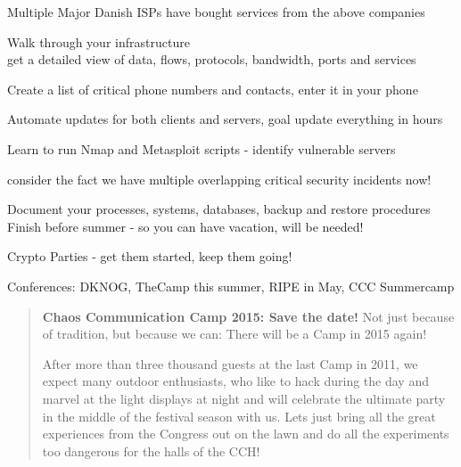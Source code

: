 \documentclass[20pt,landscape,a4paper,footrule]{foils}
\begin{document}
\vskip 2cm
\centerline{Multiple Major Danish ISPs have bought services from the above companies}




\begin{list1}
\item Walk through your infrastructure\\
get a detailed view of data, flows, protocols, bandwidth, ports and services

\item Create a list of critical phone numbers and contacts, enter it in your phone
\item Automate updates for both clients and servers, goal update everything in hours
\item Learn to run Nmap and Metasploit scripts - identify vulnerable servers
\end{list1}

\centerline{consider the fact we have multiple overlapping critical security incidents now!}





\begin{list1}
\item Document your processes, systems, databases, backup and restore procedures\\
Finish before summer - so you can have vacation, will be needed!
\item Crypto Parties - get them started, keep them going!
\item Conferences: DKNOG, TheCamp this summer, RIPE in May, CCC Summercamp
\end{list1}


\begin{quote}
{\bf Chaos Communication Camp 2015: Save the date!}
Not just because of tradition, but because we can: There will be a Camp in 2015 again!

After more than three thousand guests at the last Camp in 2011, we expect many outdoor enthusiasts, who like to hack during the day and marvel at the light displays at night and will celebrate the ultimate party in the middle of the festival season with us. Lets just bring all the great experiences from the Congress out on the lawn and do all the experiments too dangerous for the halls of the CCH!
\end{quote}
\end{document}
